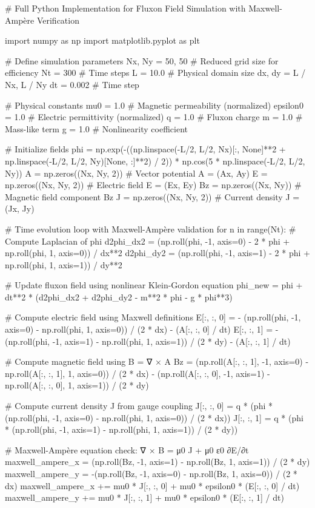 # Full Python Implementation for Fluxon Field Simulation with Maxwell-Ampère Verification

import numpy as np
import matplotlib.pyplot as plt

# Define simulation parameters
Nx, Ny = 50, 50  # Reduced grid size for efficiency
Nt = 300  # Time steps
L = 10.0  # Physical domain size
dx, dy = L / Nx, L / Ny
dt = 0.002  # Time step

# Physical constants
mu0 = 1.0  # Magnetic permeability (normalized)
epsilon0 = 1.0  # Electric permittivity (normalized)
q = 1.0  # Fluxon charge
m = 1.0  # Mass-like term
g = 1.0  # Nonlinearity coefficient

# Initialize fields
phi = np.exp(-((np.linspace(-L/2, L/2, Nx)[:, None]**2 + np.linspace(-L/2, L/2, Ny)[None, :]**2) / 2)) * np.cos(5 * np.linspace(-L/2, L/2, Ny))
A = np.zeros((Nx, Ny, 2))  # Vector potential A = (Ax, Ay)
E = np.zeros((Nx, Ny, 2))  # Electric field E = (Ex, Ey)
Bz = np.zeros((Nx, Ny))  # Magnetic field component Bz
J = np.zeros((Nx, Ny, 2))  # Current density J = (Jx, Jy)

# Time evolution loop with Maxwell-Ampère validation
for n in range(Nt):
    # Compute Laplacian of phi
    d2phi_dx2 = (np.roll(phi, -1, axis=0) - 2 * phi + np.roll(phi, 1, axis=0)) / dx**2
    d2phi_dy2 = (np.roll(phi, -1, axis=1) - 2 * phi + np.roll(phi, 1, axis=1)) / dy**2

    # Update fluxon field using nonlinear Klein-Gordon equation
    phi_new = phi + dt**2 * (d2phi_dx2 + d2phi_dy2 - m**2 * phi - g * phi**3)

    # Compute electric field using Maxwell definitions
    E[:, :, 0] = - (np.roll(phi, -1, axis=0) - np.roll(phi, 1, axis=0)) / (2 * dx) - (A[:, :, 0] / dt)
    E[:, :, 1] = - (np.roll(phi, -1, axis=1) - np.roll(phi, 1, axis=1)) / (2 * dy) - (A[:, :, 1] / dt)

    # Compute magnetic field using B = ∇ × A
    Bz = (np.roll(A[:, :, 1], -1, axis=0) - np.roll(A[:, :, 1], 1, axis=0)) / (2 * dx) - (np.roll(A[:, :, 0], -1, axis=1) - np.roll(A[:, :, 0], 1, axis=1)) / (2 * dy)

    # Compute current density J from gauge coupling
    J[:, :, 0] = q * (phi * (np.roll(phi, -1, axis=0) - np.roll(phi, 1, axis=0)) / (2 * dx))
    J[:, :, 1] = q * (phi * (np.roll(phi, -1, axis=1) - np.roll(phi, 1, axis=1)) / (2 * dy))

    # Maxwell-Ampère equation check: ∇ × B = μ0 J + μ0 ε0 ∂E/∂t
    maxwell_ampere_x = (np.roll(Bz, -1, axis=1) - np.roll(Bz, 1, axis=1)) / (2 * dy)
    maxwell_ampere_y = -(np.roll(Bz, -1, axis=0) - np.roll(Bz, 1, axis=0)) / (2 * dx)
    maxwell_ampere_x += mu0 * J[:, :, 0] + mu0 * epsilon0 * (E[:, :, 0] / dt)
    maxwell_ampere_y += mu0 * J[:, :, 1] + mu0 * epsilon0 * (E[:, :, 1] / dt)


